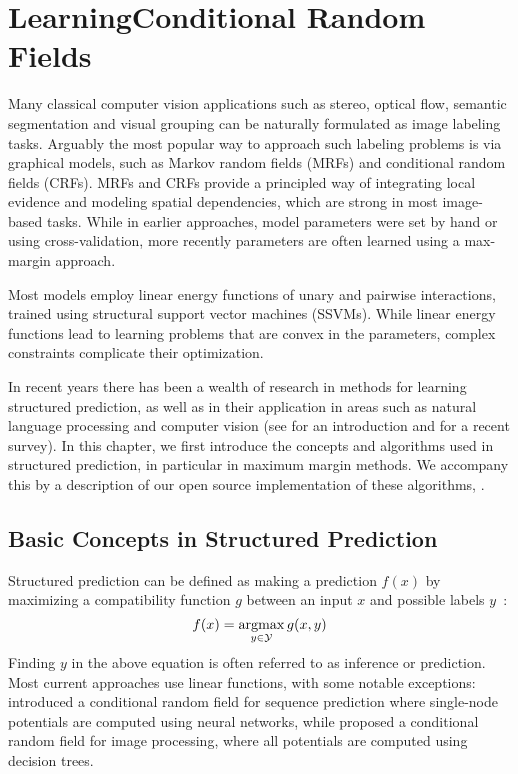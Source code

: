 \chapter[Learning Conditional Random Fields]{Learning\linebreak[4] Conditional Random Fields}\label{ch:structured_pystruct}

Many classical computer vision applications such as stereo, optical flow, semantic
segmentation and visual grouping can be naturally formulated as image labeling tasks.
%
Arguably the most popular way to approach such labeling problems is via graphical
models, such as Markov random fields (MRFs) and conditional random fields (CRFs).
MRFs and CRFs provide a principled way of integrating local evidence and
modeling spatial dependencies, which are strong in most image-based tasks.
%
While in earlier approaches, model parameters were set by hand or using
cross-validation, more recently parameters are often learned using a max-margin
approach.

Most models employ linear energy functions of unary and pairwise interactions,
trained using structural support vector machines (SSVMs). While linear energy
functions lead to learning problems that are convex in the parameters, complex
constraints complicate their optimization.  %

In recent years there has been a wealth of research in methods for learning
structured prediction, as well as in their application in areas such as natural
language processing and computer vision (see \citet{nowozin2011structured}
for an introduction and \citet{blake2011markov} for a recent survey).
%
In this chapter, we first introduce the concepts and algorithms used in
structured prediction, in particular in maximum margin methods. We 
accompany this by a description of our open source implementation of these
algorithms, \pystruct.

\pagebreak

\section{Basic Concepts in Structured Prediction}

Structured prediction can be defined as making a prediction $f(x)$ by
maximizing a compatibility function $g$ between an input $x$ and possible
labels
$y$~\citep{nowozin2011structured}:
\begin{equation}
    f(x) = \operatorname*{argmax}_{y \in \mathcal{Y}} g(x, y)
\end{equation}
Finding $y$ in the above equation is often referred to as inference
or prediction.
Most current approaches use linear functions, with some notable exceptions:
\citet{peng2009conditional} introduced a conditional random field for sequence
prediction where single-node potentials are computed using neural networks,
while \citet{nowozin2011decision} proposed a conditional random field for image
processing, where all potentials are computed using decision trees.

